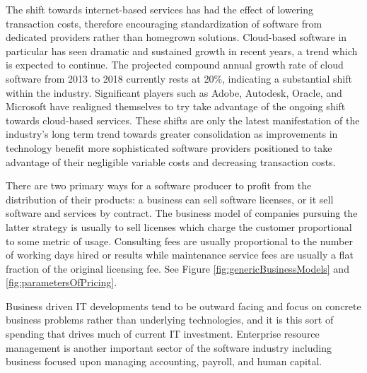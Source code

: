 The shift towards internet-based services has had the effect of lowering transaction costs, therefore encouraging standardization of software from dedicated providers rather than homegrown solutions.\autocite[46]{buxmann2012software}\autocite[]{SurveysSoftware2015}
Cloud-based software in particular has seen dramatic and sustained growth in recent years, a trend which is expected to continue.
The projected compound annual growth rate of cloud software from 2013 to 2018 currently rests at 20\%, indicating a substantial shift within the industry. Significant players such as Adobe, Autodesk, Oracle, and Microsoft have realigned themselves to try take advantage of the ongoing shift towards cloud-based services.\autocite[40]{SurveysSoftware2015}
These shifts are only the latest manifestation of the industry's long term trend towards greater consolidation as improvements in technology benefit more sophisticated software providers positioned to take advantage of their negligible variable costs and decreasing transaction costs.\autocite[14]{buxmann2012software}

There are two primary ways for a software producer to profit from the distribution of their products: a business can sell software licenses, or it sell software and services by contract.\autocite[]{ValuelineOverview}
The business model of companies pursuing the latter strategy is usually to sell licenses which charge the customer proportional to some metric of usage.\autocite[14]{buxmann2012software}
Consulting fees are usually proportional to the number of working days hired or results while maintenance service fees are usually a flat fraction of the original licensing fee.\autocite[16]{buxmann2012software} See Figure \ref{fig:genericBusinessModels} and \ref{fig:parametersOfPricing}.

Business driven IT developments tend to be outward facing and focus on concrete business problems rather than underlying technologies, and it is this sort of spending that drives much of current IT investment.\autocite[]{NextGenBusinessSoftware}
Enterprise resource management is another important sector of the software industry including business focused upon managing accounting, payroll, and human capital.\autocite[46]{SurveysSoftware2015}

